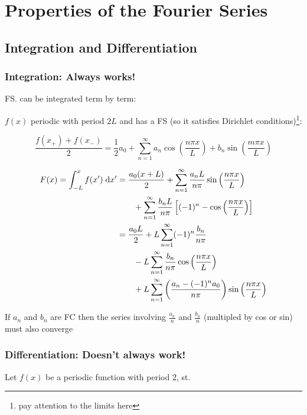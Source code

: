 \documentclass[a4paper]{article}
\begin{document}
\section{Properties of the Fourier Series}

\subsection{Integration and Differentiation}

\subsubsection{Integration: Always works!}

FS. can be integrated term by term:

$ f(x) $ periodic with period $ 2L $ and has a FS (so it satisfies Dirichlet conditions)\footnote{pay attention to the limits here}:

\[ \frac{f(x_{+}) + f(x_{-})}{2} = \frac{1}{2} a_{0} + \sum_{n=1}^{\infty} a_{n} \cos \left( \frac{n \pi x}{L} \right) + b_{n} \sin \left( \frac{m \pi x}{L} \right)   \] 

\begin{align*}
F(x) = \int_{-L}^{x} f(x') \; \mathrm{d} x' & = \frac{a_{0}(x + L)}{2} + \sum_{n=1}^{\infty} \frac{a_{n}L}{n \pi } \sin\left( \frac{n \pi x}{L} \right) \\
& \qquad  + \sum_{n = 1 }^{\infty} \frac{b_{n} L}{n \pi} \left[  (-1)^{n} - \cos \left( \frac{n \pi x}{L} \right)  \right] \\
& = \frac{a_{0}L}{2} + L \sum_{n=1}^{\infty} (-1)^{n} \frac{b_{n}}{n \pi} \\
& \qquad - L \sum_{n = 1 }^{\infty}\frac{b_{n}}{n \pi} \cos\left( \frac{n \pi x}{L} \right)  \\
& \qquad + L \sum_{n = 1 }^{\infty} \left( \frac{a_{n} - (-1)^{n}a_{0}}{n \pi} \right) \sin \left( \frac{n \pi x}{L} \right)  
 \end{align*}
 
If $ a_{n} $ and $ b_{n} $ are FC then the series involving $ \frac{a_{n}}{n} $ and $ \frac{b_{n}}{n}  $ (multipled by cos or sin) must also converge 

\subsubsection{Differentiation: Doesn't always work!}

Let $ f(x) $ be a periodic function with period 2, st.
\end{document}
